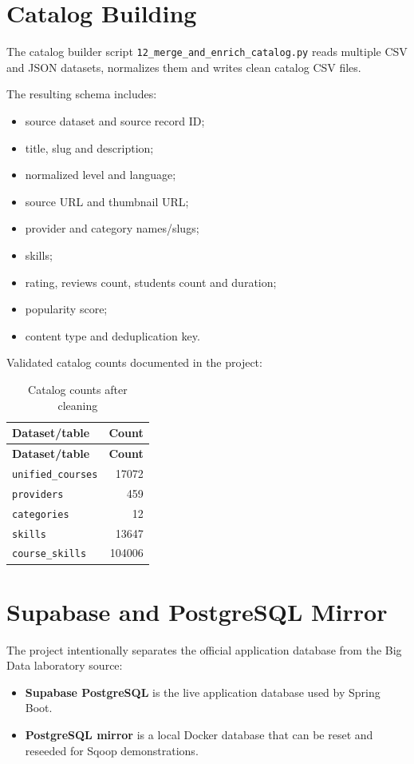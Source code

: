 \documentclass[12pt,a4paper]{report}
\begin{document}
\section{Catalog Building}
The catalog builder script \texttt{12\_merge\_and\_enrich\_catalog.py} reads multiple CSV and JSON datasets, normalizes them and writes clean catalog CSV files.

The resulting schema includes:
\begin{itemize}[leftmargin=*]
    \item source dataset and source record ID;
    \item title, slug and description;
    \item normalized level and language;
    \item source URL and thumbnail URL;
    \item provider and category names/slugs;
    \item skills;
    \item rating, reviews count, students count and duration;
    \item popularity score;
    \item content type and deduplication key.
\end{itemize}

Validated catalog counts documented in the project:

\begin{longtable}{p{}r}
\caption{Catalog counts after cleaning}\\
\toprule
\textbf{Dataset/table} & \textbf{Count}\\
\midrule
\endfirsthead
\toprule
\textbf{Dataset/table} & \textbf{Count}\\
\midrule
\endhead
\texttt{unified\_courses} & 17072\\
\texttt{providers} & 459\\
\texttt{categories} & 12\\
\texttt{skills} & 13647\\
\texttt{course\_skills} & 104006\\
\bottomrule
\end{longtable}

\section{Supabase and PostgreSQL Mirror}
The project intentionally separates the official application database from the Big Data laboratory source:

\begin{itemize}[leftmargin=*]
    \item \textbf{Supabase PostgreSQL} is the live application database used by Spring Boot.
    \item \textbf{PostgreSQL mirror} is a local Docker database that can be reset and reseeded for Sqoop demonstrations.
\end{itemize}
\end{document}
